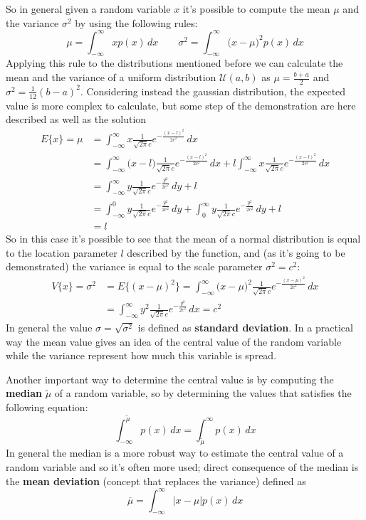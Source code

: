 	So in general given a random variable $x$ it's possible to compute the mean $\mu$ and the variance $\sigma^2$ by using the following rules:
	\[ \mu = \int_{-\infty}^\infty x p(x)\, dx \qquad \sigma^2 = \int_{-\infty}^\infty \big(x-\mu \big)^2 p(x)\, dx  \]
	Applying this rule to the distributions mentioned before we can calculate the mean and the variance of a uniform distribution $\mathcal U (a,b)$ as $\mu = \frac{b+a}{2}$ and $\sigma^2 = \frac 1 {12} (b-a)^2$. Considering instead the gaussian distribution, the expected value is more complex to calculate, but some step of the demonstration are here described as well as the solution
	\begin{align*}
		E\{x\} = \mu & = \int_{-\infty}^\infty x \frac 1 {\sqrt{2\pi} c} e^{-\frac{(x-l)^2}{2c^2}} \, dx \\ & = \int_{-\infty}^\infty \big(x-l\big) \frac 1 {\sqrt{2\pi} c} e^{-\frac{(x-l)^2}{2c^2}} \, dx + l \int_{-\infty}^\infty x \frac 1 {\sqrt{2\pi} c} e^{-\frac{(x-l)^2}{2c^2}} \, dx \\
		& = \int_{-\infty}^\infty y \frac 1 {\sqrt{2\pi} c} e^{-\frac{y^2}{2c^2}} \, dy + l\\
		& = \int_{-\infty}^0 y \frac 1 {\sqrt{2\pi} c} e^{-\frac{y^2}{2c^2}} \, dy + \int_0^\infty y \frac 1 {\sqrt{2\pi} c} e^{-\frac{y^2}{2c^2}} \, dy + l \\
		& = l
	\end{align*}
	So in this case it's possible to see that the mean of a normal distribution is equal to the location parameter $l$ described by the function, and (as it's going to be demonstrated) the variance is equal to the scale parameter $\sigma^2 = c^2$:
	\begin{align*}
		V\{x\} = \sigma^2 & = E\big\{(x-\mu)^2\big\} = \int_{-\infty}^\infty \big(x-\mu\big)^2 \frac 1 {\sqrt{2\pi} c} e^{-\frac{(x-\mu)^2}{2c^2}} \, dx \\
		& = \int_{-\infty}^\infty y^2 \frac 1 {\sqrt{2\pi} c} e^{-\frac{y^2}{2c^2}} \, dx = c^2
	\end{align*}
	In general the value $\sigma= \sqrt{\sigma^2}$ is defined as \textbf{standard deviation}. In a practical way the mean value gives an idea of the central value of the random variable while the variance represent how much this variable is spread.
	
	Another important way to determine the central value is by computing the \textbf{median} $\tilde \mu$ of a random variable, so by determining the values that satisfies the following equation:
	\[ \int_{-\infty} ^{\tilde \mu} p(x)\, dx = \int_{\tilde \mu}^\infty p(x) \, dx \]
	In general the median is a more robust way to estimate the central value of a random variable and so it's often more used; direct consequence of the median is the \textbf{mean deviation} (concept that replaces the variance) defined as
	\[ \overline \mu = \int_{-\infty}^\infty |x-\mu| p(x)\, dx \]
	
	
	
	
	
	
	
	
	
	
	
	
	
	
	
	
	
	
	
	